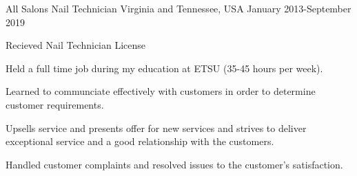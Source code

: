 

\begin{cventries}

  \cventry
    {All Salons} %
    {Nail Technician} %
    {Virginia and Tennessee, USA} %
    {January 2013-September 2019} %
    {
      \begin{cvitems} %
      \item Recieved Nail Technician License
      \item Held a full time job during my education at ETSU (35-45 hours per week).
      \item Learned to communciate effectively with customers in order to determine customer requirements.
      \item Upsells service and presents offer for new services and strives to deliver exceptional service and a good relationship with the customers.
      \item Handled customer complaints and resolved issues to the customer's satisfaction.
      \end{cvitems}
    }
\end{cventries}
